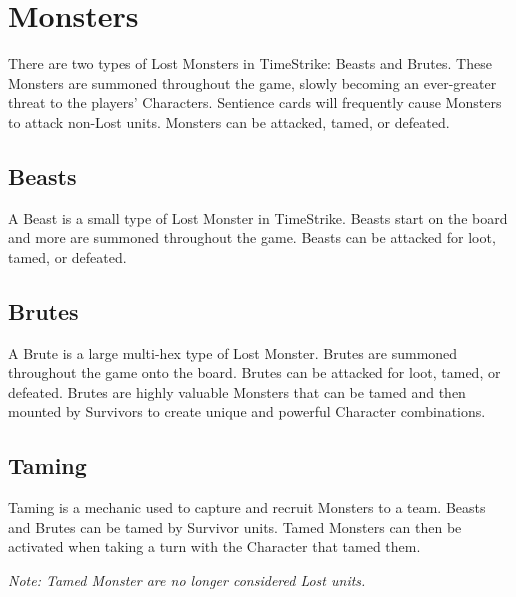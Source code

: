 \documentclass[../main.tex]{subfiles}
\begin{document}
\section{Monsters}
There are two types of Lost Monsters in TimeStrike: Beasts and Brutes. These Monsters are summoned throughout the game, slowly becoming an ever-greater threat to the players’ Characters. Sentience cards will frequently cause Monsters to attack non-Lost units. Monsters can be attacked, tamed, or defeated.

\subsection{Beasts}
A Beast is a small type of Lost Monster in TimeStrike. Beasts start on the board and more are summoned throughout the game. Beasts can be attacked for loot, tamed, or defeated.

\subsection{Brutes}
A Brute is a large multi-hex type of Lost Monster. Brutes are summoned throughout the game onto the board. Brutes can be attacked for loot, tamed, or defeated. Brutes are highly valuable Monsters that can be tamed and then mounted by Survivors to create unique and powerful Character combinations.

\subsection{Taming}
Taming is a mechanic used to capture and recruit Monsters to a team. Beasts and Brutes can be tamed by Survivor units. Tamed Monsters can then be activated when taking a turn with the Character that tamed them.

\textit{Note: Tamed Monster are no longer considered Lost units.}
\end{document}
